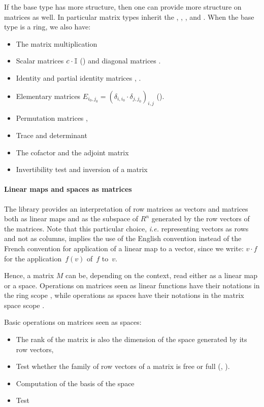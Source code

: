 If the base type has more structure, then one can provide more
structure on matrices as well. In particular matrix types inherit the
, , ,  and
. When the base type is a ring, we also have:
\begin{itemize}
\item The matrix multiplication \C{_ * _}
\item Scalar matrices $c\cdot \mathbb{I}$ () and diagonal matrices
  .
\item Identity  and partial identity matrices ,
  .
\item Elementary matrices
  $E_{i_0,j_0} = \left(\delta_{i,i_0}\cdot\delta_{j,j_0}\right)_{i,j}$
  ().
\item Permutation matrices , 
\item Trace  and determinant 
\item The cofactor  and the adjoint matrix
\item Invertibility test  and inversion of a matrix
\end{itemize}

\paragraph{Linear maps and spaces as matrices}

The library  provides an interpretation of row
matrices as vectors and matrices both as linear maps and as the
subspace of $R^n$ generated by the row vectors of the matrices. Note that
this particular choice, \textit{i.e.} representing vectors as rows and
not as columns, implies the use of the English convention instead of
the French convention for application of a linear map to a
vector, since we write: $v \cdot f$ for the application~$f(v)$ of~$f$
to~$v$.

Hence, a matrix $M$ can be, depending on the context, read either as a
linear map or a space. Operations on matrices seen as linear
functions have their notations in the ring scope , while
operations as spaces have their notations in the matrix space scope
.

Basic operations on matrices seen as spaces:
\begin{itemize}
\item The rank of the matrix is also the dimension of the space
  generated by its row vectors, 
\item Test whether the family of row vectors of a matrix is free or
  full (, ).
\item Computation of the basis of the space
\item Test
\end{itemize}

